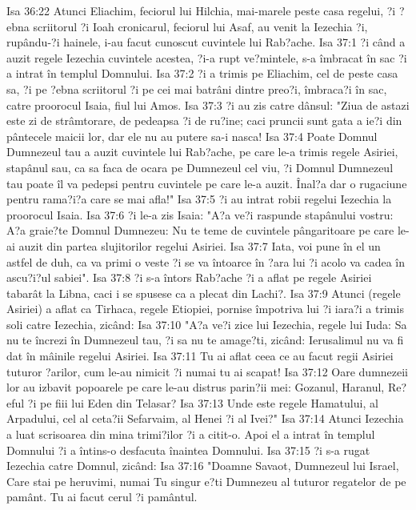 Isa 36:22  Atunci Eliachim, feciorul lui Hilchia, mai-marele peste casa regelui, ?i ?ebna scriitorul ?i Ioah cronicarul, feciorul lui Asaf, au venit la Iezechia ?i, rupându-?i hainele, i-au facut cunoscut cuvintele lui Rab?ache.
Isa 37:1  ?i când a auzit regele Iezechia cuvintele acestea, ?i-a rupt ve?mintele, s-a îmbracat în sac ?i a intrat în templul Domnului.
Isa 37:2  ?i a trimis pe Eliachim, cel de peste casa sa, ?i pe ?ebna scriitorul ?i pe cei mai batrâni dintre preo?i, îmbraca?i în sac, catre proorocul Isaia, fiul lui Amos.
Isa 37:3  ?i au zis catre dânsul: "Ziua de astazi este zi de strâmtorare, de pedeapsa ?i de ru?ine; caci pruncii sunt gata a ie?i din pântecele maicii lor, dar ele nu au putere sa-i nasca!
Isa 37:4  Poate Domnul Dumnezeul tau a auzit cuvintele lui Rab?ache, pe care le-a trimis regele Asiriei, stapânul sau, ca sa faca de ocara pe Dumnezeul cel viu, ?i Domnul Dumnezeul tau poate îl va pedepsi pentru cuvintele pe care le-a auzit. Înal?a dar o rugaciune pentru rama?i?a care se mai afla!"
Isa 37:5  ?i au intrat robii regelui Iezechia la proorocul Isaia.
Isa 37:6  ?i le-a zis Isaia: "A?a ve?i raspunde stapânului vostru: A?a graie?te Domnul Dumnezeu: Nu te teme de cuvintele pângaritoare pe care le-ai auzit din partea slujitorilor regelui Asiriei.
Isa 37:7  Iata, voi pune în el un astfel de duh, ca va primi o veste ?i se va întoarce în ?ara lui ?i acolo va cadea în ascu?i?ul sabiei".
Isa 37:8  ?i s-a întors Rab?ache ?i a aflat pe regele Asiriei tabarât la Libna, caci i se spusese ca a plecat din Lachi?.
Isa 37:9  Atunci (regele Asiriei) a aflat ca Tirhaca, regele Etiopiei, pornise împotriva lui ?i iara?i a trimis soli catre Iezechia, zicând:
Isa 37:10  "A?a ve?i zice lui Iezechia, regele lui Iuda: Sa nu te încrezi în Dumnezeul tau, ?i sa nu te amage?ti, zicând: Ierusalimul nu va fi dat în mâinile regelui Asiriei.
Isa 37:11  Tu ai aflat ceea ce au facut regii Asiriei tuturor ?arilor, cum le-au nimicit ?i numai tu ai scapat!
Isa 37:12  Oare dumnezeii lor au izbavit popoarele pe care le-au distrus parin?ii mei: Gozanul, Haranul, Re?eful ?i pe fiii lui Eden din Telasar?
Isa 37:13  Unde este regele Hamatului, al Arpadului, cel al ceta?ii Sefarvaim, al Henei ?i al Ivei?"
Isa 37:14  Atunci Iezechia a luat scrisoarea din mina trimi?ilor ?i a citit-o. Apoi el a intrat în templul Domnului ?i a întins-o desfacuta înaintea Domnului.
Isa 37:15  ?i s-a rugat Iezechia catre Domnul, zicând:
Isa 37:16  "Doamne Savaot, Dumnezeul lui Israel, Care stai pe heruvimi, numai Tu singur e?ti Dumnezeu al tuturor regatelor de pe pamânt. Tu ai facut cerul ?i pamântul.
